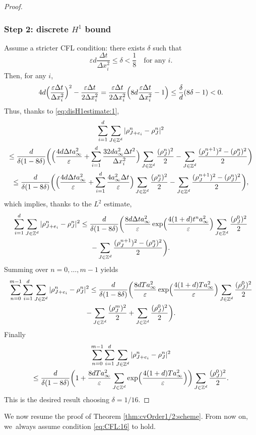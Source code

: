 \documentclass[JEP,XML,SOM,Unicode, NoFloatCountersInSection,published]{cedram}
\def\ZZ{\mathbb{Z}}
\def\eps{\varepsilon}
\def\dt{\Delta t}
\def\dx{\Delta x}
\theoremstyle{plain}
\theoremstyle{definition}
\begin{document}
\begin{proof}
\subsubsection*{Step 2: discrete $H^1$ bound}
Assume a stricter CFL condition: there exists $\delta$ such that
\begin{equation}\label{eq:CFL:16}
\eps d \frac{\dt}{\dx_i^2} \leq \delta < \frac 18 \quad \text{for any } i.
\end{equation}
Then, for any $i$,
\[
4d\Bigl(\frac{\eps \dt}{\dx_i^2}\Bigr)^2 - \frac{\eps \dt}{2\dx_i^2}
= \frac{\eps \dt}{2\dx_i^2}\Bigl(8d\frac{\eps \dt}{\dx_i^2} - 1\Bigr) \leq \frac{\delta}{d}(8\delta - 1) < 0.
\]
Thus, thanks to \ref{eq:disH1estimate:1},
\begin{multline*}
\sum_{i=1}^{d} \sum_{J \in \ZZ^d} |\rho_{J+e_i}^n - \rho_J^n|^2 \\
\leq
\frac{d}{\delta(1 - 8\delta)}\biggl(\Bigl(\frac{4d\dt a_\infty^2}{\eps} + \sum_{i=1}^{d} \frac{32 d a_\infty^2\dt^2}{\dx_i^2}\Bigr) \sum_{J\in\ZZ^d} \frac{(\rho_J^n)^2}{2}
- \sum_{J \in \ZZ^d} \frac{(\rho_J^{n+1})^2 -(\rho_J^n)^2}{2} \biggr) \\
\leq
\frac{d}{\delta(1 - 8\delta)}\biggl(\Bigl(\frac{4d\dt a_\infty^2}{\eps} + \sum_{i=1}^{d} \frac{4 a_\infty^2\dt}{\eps} \Bigr) \sum_{J\in\ZZ^d} \frac{(\rho_J^n)^2}{2}
- \sum_{J \in \ZZ^d} \frac{(\rho_J^{n+1})^2 -(\rho_J^n)^2}{2} \biggr),
\end{multline*}
which implies, thanks to the $L^2$ estimate,
\begin{multline*}
\sum_{i=1}^{d} \sum_{J \in \ZZ^d} |\rho_{J+e_i}^n - \rho_J^n|^2 \leq
\frac{d}{\delta(1 - 8\delta)} \biggl(\frac{8d\dt a_\infty^2}{\eps}
\exp\Bigl(\frac{4(1 + d)t^n a_\infty^2}{\eps}\Bigr) \sum_{J \in \ZZ^d} \frac{(\rho_J^0)^2}{2}
\\
- \sum_{J \in \ZZ^d} \frac{(\rho_J^{n+1})^2
-(\rho_J^n)^2}{2} \biggr).
\end{multline*}
Summing over $n=0,\ldots,m-1$ yields
\begin{multline*}
\sum_{n = 0}^{m-1} \sum_{i=1}^{d} \sum_{J \in \ZZ^d} |\rho_{J+e_i}^n - \rho_J^n|^2 \leq
\frac{d}{\delta(1 - 8\delta)} \biggl(\frac{8dT a_\infty^2}{\eps}
\exp\Bigl(\frac{4(1 + d)T a_\infty^2}{\eps}\Bigr) \sum_{J \in \ZZ^d} \frac{(\rho_J^0)^2}{2}
\\
 - \sum_{J \in \ZZ^d} \frac{(\rho_J^{m})^2}{2}
+ \sum_{J \in \ZZ^d} \frac{(\rho_J^0)^2}{2} \biggr).
\end{multline*}
Finally
\begin{multline*}
\sum_{n = 0}^{m-1} \sum_{i=1}^{d} \sum_{J \in \ZZ^d} |\rho_{J+e_i}^n - \rho_J^n|^2 \\
\leq
\frac{d}{\delta(1 - 8\delta)} \biggl(1 + \frac{8dT a_\infty^2}{\eps} \sum_{J\in\ZZ^d}
\exp\Bigl(\frac{4(1 + d)T a_\infty^2}{\eps} \Bigr)\biggr) \sum_{J \in \ZZ^d} \frac{(\rho_J^0)^2}{2}.
\end{multline*}
This is the desired result choosing $\delta = 1/16$.
\end{proof}
We now resume the proof of Theorem \ref{thm:cvOrder1/2:scheme}. From now on, we~always assume condition \eqref{eq:CFL:16} to hold.
\end{document}
